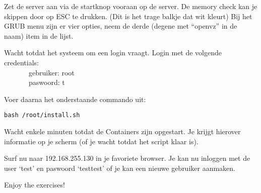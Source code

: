 Zet de server aan via de startknop vooraan op de server. De memory check kan je skippen door op ESC te drukken. (Dit is het trage balkje dat wit kleurt) Bij het GRUB menu zijn er vier opties, neem de derde (degene met ``openvz'' in de naam) item in de lijst. 

Wacht totdat het systeem om een login vraagt. Login met de volgende credentials:\\ 
~~~~~~~gebruiker: root\\
~~~~~~~paswoord: t

Voer daarna het onderstaande commando uit:
\begin{lstlisting}
bash /root/install.sh
\end{lstlisting}

Wacht enkele minuten totdat de Containers zijn opgestart. Je krijgt hierover informatie op je scherm (of je wacht totdat het script klaar is). 

Surf nu naar 192.168.255.130 in je favoriete browser. 
Je kan nu inloggen met de user `test' en paswoord `testtest' of je kan een nieuwe gebruiker aanmaken.

Enjoy the exercises!